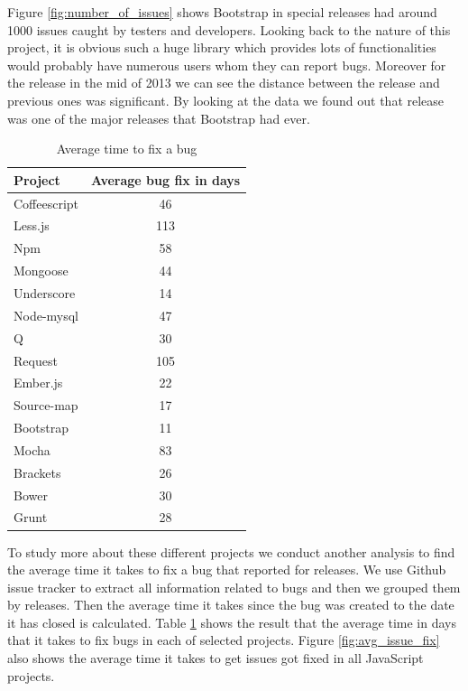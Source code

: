 Figure \ref{fig:number_of_issues} shows Bootstrap in special releases had around 1000 issues caught by testers and developers. Looking back to the nature of this project, it is obvious such a huge library which provides lots of functionalities would probably have numerous users whom they can report bugs. Moreover for the release in the mid of 2013 we can see the distance between the release and previous ones was significant. By looking at the data we found out that release was one of the major releases that Bootstrap had ever. 

\begin{table}[!hbt]
	\begin{center}
		\caption{Average time to fix a bug}
		\label{tab:average_time_bugfix}
		\begin{tabular}{l| c }
			\toprule
			\textbf{Project}  & \textbf{Average bug fix in days} \\ \midrule              
			Coffeescript    & 46  \\
			Less.js         & 113 \\
			Npm             & 58  \\
			Mongoose        & 44  \\
			Underscore      & 14  \\
			Node-mysql      & 47  \\
			Q               & 30  \\
			Request         & 105 \\
			Ember.js        & 22  \\
			Source-map      & 17  \\
			Bootstrap       & 11  \\
			Mocha           & 83  \\
			Brackets        & 26  \\
			Bower           & 30  \\
			Grunt           & 28  \\  \bottomrule
		\end{tabular}
	\end{center}
\end{table}

To study more about these different projects we conduct another analysis to find the average time it takes to fix a bug that reported for releases. We use Github issue tracker to extract all information related to bugs and then we grouped them by releases. Then the average time it takes since the bug was created to the date it has closed is calculated. Table \ref{tab:average_time_bugfix} shows the result that the average time in days that it takes to fix bugs in each of selected projects. Figure \ref{fig:avg_issue_fix} also shows the average time it takes to get issues got fixed in all JavaScript projects.
  
